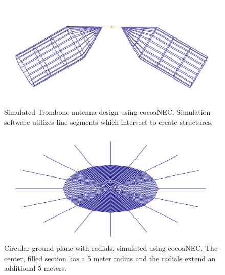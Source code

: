 \begin{figure}[htb]
\centering
\begin{minipage}[b]{0.56\textwidth}
\centering
\includegraphics[width=0.95\linewidth]{SCIHI_system/figures/trombone_sim.png}
\caption{Simulated Trombone antenna design using cocoaNEC. Simulation software utilizes line segments which intersect to create structures. }
\label{Fig:trombone_sym}
\end{minipage}%
\begin{minipage}[b]{0.02\textwidth}
\hspace{1cm}
\end{minipage}%
\begin{minipage}[b]{0.42\textwidth}
\centering
\includegraphics[width=0.95\linewidth]{SCIHI_system/figures/ground_plane_sim.png}
\caption{Circular ground plane with radials, simulated using cocoaNEC. The center, filled section has a 5 meter radius and the radials extend an additional 5 meters.}
\label{Fig:gp_sym}
\end{minipage}
\end{figure}

